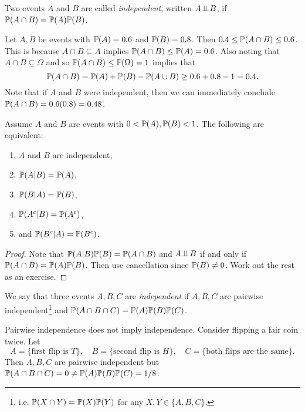 \begin{definition}
  Two events $A$ and $B$ are called
  \emph{independent}, written
  $A {\perp\!\!\!\perp} B$, if
  $\mathbb{P}(A \cap B) = \mathbb{P}(A) \mathbb{P}(B)$.
\end{definition}

\begin{example}
  Let $A, B$ be events with
  $\mathbb{P}(A) = 0.6$ and $\mathbb{P}(B) = 0.8$. Then
  $0.4 \le \mathbb{P}(A \cap B) \le 0.6$.
  This is because $A \cap B \subseteq A$ implies
  $\mathbb{P}(A \cap B) \le \mathbb{P}(A) = 0.6$. Also noting
  that $A \cap B \subseteq \Omega$ and so
  $\mathbb{P}(A \cap B) \le \mathbb{P}(\Omega) = 1$ implies that
  \[
    \mathbb{P}(A \cap B) = \mathbb{P}(A) + \mathbb{P}(B) - \mathbb{P}(A \cup B)
    \ge 0.6 + 0.8 - 1 = 0.4.
  \]
  Note that if $A$ and $B$ were independent,
  then we can immediately conclude
  $\mathbb{P}(A \cap B) = 0.6(0.8) = 0.48$.
\end{example}

\begin{prop}
  Assume $A$ and $B$ are events with
  $0 < \mathbb{P}(A), \mathbb{P}(B) < 1$.
  The following are equivalent:
  \begin{enumerate}
    \item $A$ and $B$ are independent,
    \item $\mathbb{P}(A | B) = \mathbb{P}(A)$,
    \item $\mathbb{P}(B | A) = \mathbb{P}(B)$,
    \item $\mathbb{P}(A^c | B) = \mathbb{P}(A^c)$,
    \item and $\mathbb{P}(B^c | A) = \mathbb{P}(B^c)$.
  \end{enumerate}
\end{prop}

\begin{proof}
  Note that $\mathbb{P}(A | B) \mathbb{P}(B) = \mathbb{P}(A \cap B)$
  and $A {\perp\!\!\!\perp} B$ if and only if
  $\mathbb{P}(A \cap B) = \mathbb{P}(A) \mathbb{P}(B)$. Then
  use cancellation since $\mathbb{P}(B) \ne 0$. Work
  out the rest as an exercise.
\end{proof}

\begin{definition}
  We say that three events $A, B, C$ are
  \emph{independent} if $A, B, C$ are pairwise
  independent\footnote{i.e. $\mathbb{P}(X \cap Y) = \mathbb{P}(X)\mathbb{P}(Y)$ for any $X, Y \in \{A, B, C\}$.}
  and
  $\mathbb{P}(A \cap B \cap C) = \mathbb{P}(A) \mathbb{P}(B) \mathbb{P}(C)$.
\end{definition}

\begin{remark}
  Pairwise independence does not imply
  independence. Consider flipping a fair coin
  twice. Let
  \[
    A = \{\text{first flip is } T\}, \quad
    B = \{\text{second flip is } H\}, \quad
    C = \{\text{both flips are the same}\}.
  \]
  Then $A, B, C$ are pairwise independent but
  $\mathbb{P}(A \cap B \cap C) = 0 \ne \mathbb{P}(A) \mathbb{P}(B) \mathbb{P}(C) = 1 / 8$.
\end{remark}

